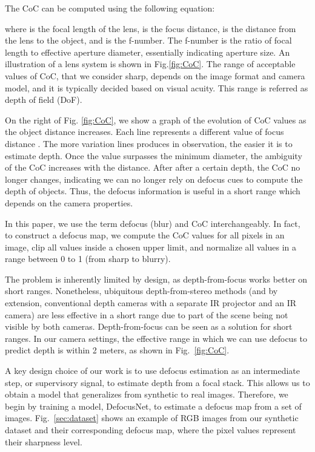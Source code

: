 \documentclass[10pt,twocolumn,letterpaper]{article}
\begin{document}
The CoC can be computed using the following equation:

where  is the focal length of the lens, 
 is the focus distance,  is the distance from the lens to the object, and  is the f-number. 
The f-number is the ratio of focal length to effective aperture diameter, essentially indicating aperture size. An illustration of a lens system is shown in Fig.\ref{fig:CoC}.  
The range of acceptable values of CoC, that we consider sharp, depends on the image format and camera model, and it is typically decided based on visual acuity. This range is referred as depth of field (DoF). 

On the right of Fig. \ref{fig:CoC}, we show a graph of the evolution of CoC values as the object distance  increases. Each line represents a different value of focus distance . 
The more variation lines produces in observation, the easier it is to estimate depth. 
Once the value surpasses the minimum diameter, the ambiguity of the CoC increases with the distance. 
After after a certain depth, the CoC no longer changes, indicating we can no longer rely on defocus cues to compute the depth of objects.
Thus, the defocus information is useful in a short range which depends on the camera properties. 

In this paper, we use the term defocus (blur) and CoC interchangeably. 
In fact, to construct a defocus map, we compute the CoC values for all pixels in an image, clip all values inside a chosen upper limit, and normalize all values in a range between 0 to 1 (from sharp to blurry). 

The problem is inherently limited by design, as depth-from-focus works better on short ranges.
Nonetheless, ubiquitous depth-from-stereo methods (and by extension, conventional depth cameras with a separate IR projector and an IR camera) are less effective in a short range due to part of the scene being not visible by both cameras. 
Depth-from-focus can be seen as a solution for short ranges. 
In our camera settings, the effective range in which we can use defocus to predict depth is within 2 meters, as shown in Fig.~\ref{fig:CoC}.

A key design choice of our work is to use defocus estimation as an intermediate step, or supervisory signal, to estimate depth from a focal stack. This allows us to obtain a model that generalizes from synthetic to real images.  
Therefore, we begin by training a model, DefocusNet, to estimate a defocus map from a set of images.
Fig.~\ref{sec:dataset} shows an example of RGB images from our synthetic dataset and their corresponding defocus map, where the pixel values represent their sharpness level.
\end{document}
